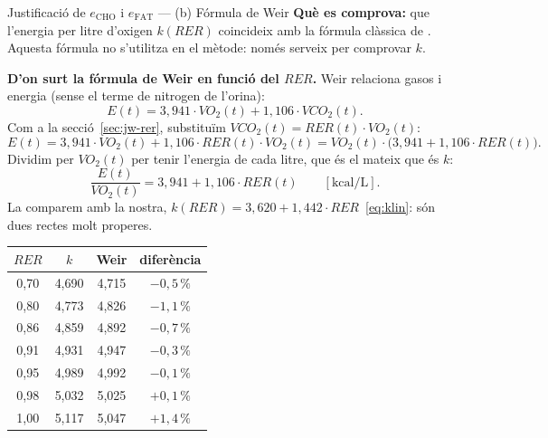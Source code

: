 \documentclass[10pt,a4paper]{article}
\newcommand{\sub}[1]{{\scriptscriptstyle\mathrm{#1}}}   %
\newcommand{\CHO}{\sub{CHO}}
\newcommand{\FAT}{\sub{FAT}}
\newcommand{\VO}{\ensuremath{\mathit{VO}_2}}               %
\newcommand{\VCO}{\ensuremath{\mathit{VCO}_2}}
\newcommand{\RER}{\ensuremath{\mathit{RER}}}
\newcommand{\kcal}{\ensuremath{\mathrm{kcal}}}
\begin{document}
\begin{requadre}{Justificació de $e_{\CHO}$ i $e_{\FAT}$ --- (b) Fórmula de Weir}
\textbf{Què es comprova:} que l'energia per litre d'oxigen $k(\RER)$ coincideix amb la
fórmula clàssica de \citet{weir1949}. Aquesta fórmula no s'utilitza en el mètode: només
serveix per comprovar $k$.

\smallskip
\textbf{D'on surt la fórmula de Weir en funció del \RER.} Weir relaciona gasos i energia
(sense el terme de nitrogen de l'orina):
\[
  E(t)=3{,}941\cdot\VO(t)+1{,}106\cdot\VCO(t).
\]
Com a la secció~\ref{sec:jw-rer}, substituïm $\VCO(t)=\RER(t)\cdot\VO(t)$:
\[
  E(t)=3{,}941\cdot\VO(t)+1{,}106\cdot\RER(t)\cdot\VO(t)=\VO(t)\cdot\bigl(3{,}941+1{,}106\cdot\RER(t)\bigr).
\]
Dividim per $\VO(t)$ per tenir l'energia de cada litre, que és el mateix que és $k$:
\[
  \frac{E(t)}{\VO(t)}=3{,}941+1{,}106\cdot\RER(t)\qquad[\kcal/\mathrm{L}].
\]
La comparem amb la nostra, $k(\RER)=3{,}620+1{,}442\cdot\RER$~\eqref{eq:klin}: són dues
rectes molt properes.

\medskip
\noindent
\begin{minipage}[c]{0.44\linewidth}
\centering
\footnotesize
\begin{tabular}{@{}cccc@{}}
\toprule
\RER & $k$ & Weir & diferència \\
\midrule
0,70 & 4,690 & 4,715 & $-0{,}5\,\%$ \\
0,80 & 4,773 & 4,826 & $-1{,}1\,\%$ \\
0,86 & 4,859 & 4,892 & $-0{,}7\,\%$ \\
0,91 & 4,931 & 4,947 & $-0{,}3\,\%$ \\
0,95 & 4,989 & 4,992 & $-0{,}1\,\%$ \\
0,98 & 5,032 & 5,025 & $+0{,}1\,\%$ \\
1,00 & 5,117 & 5,047 & $+1{,}4\,\%$ \\
\bottomrule
\end{tabular}


\end{minipage}
\end{requadre}
\end{document}
